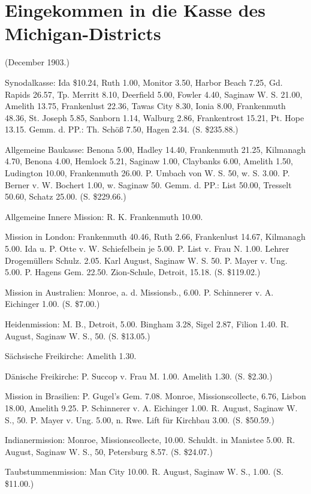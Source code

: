 \chapter[Kasse des Michigan-Districts]{Eingekommen in die Kasse des Michigan-Districts}

(December 1903.)

Synodalkasse: Ida \$10.24, Ruth 1.00, Monitor 3.50, Harbor Beach 7.25, Gd. Rapids 26.57, Tp. Merritt 8.10, Deerfield 5.00, Fowler 4.40, Saginaw W. S. 21.00, Amelith 13.75, Frankenlust 22.36, Tawas City 8.30, Ionia 8.00, Frankenmuth 48.36, St. Joseph 5.85, Sanborn 1.14, Walburg 2.86, Frankentrost 15.21, Pt. Hope 13.15. Gemm. d. PP.: Th. Schöß 7.50, Hagen 2.34. (S. \$235.88.)

Allgemeine Baukasse: Benona 5.00, Hadley 14.40, Frankenmuth 21.25, Kilmanagh 4.70, Benona 4.00, Hemlock 5.21, Saginaw 1.00, Claybanks 6.00, Amelith 1.50, Ludington 10.00, Frankenmuth 26.00. P. Umbach von W. S. 50, w. S. 3.00. P. Berner v. W. Bochert 1.00, w. Saginaw 50. Gemm. d. PP.: List 50.00, Tresselt 50.60, Schatz 25.00. (S. \$229.66.)

Allgemeine Innere Mission: R. K. Frankenmuth 10.00.

Mission in London: Frankenmuth 40.46, Ruth 2.66, Frankenlust 14.67, Kilmanagh 5.00. Ida u. P. Otte v. W. Schiefelbein je 5.00. P. List v. Frau N. 1.00. Lehrer Drogemüllers Schulz. 2.05. Karl August, Saginaw W. S. 50. P. Mayer v. Ung. 5.00. P. Hagens Gem. 22.50. Zion-Schule, Detroit, 15.18. (S. \$119.02.)

Mission in Australien: Monroe, a. d. Missionsb., 6.00. P. Schinnerer v. A. Eichinger 1.00. (S. \$7.00.)

Heidenmission: M. B., Detroit, 5.00. Bingham 3.28, Sigel 2.87, Filion 1.40. R. August, Saginaw W. S., 50. (S. \$13.05.)

Sächsische Freikirche: Amelith 1.30.

Dänische Freikirche: P. Succop v. Frau M. 1.00. Amelith 1.30. (S. \$2.30.)

Mission in Brasilien: P. Gugel’s Gem. 7.08. Monroe, Missionscollecte, 6.76, Lisbon 18.00, Amelith 9.25. P. Schinnerer v. A. Eichinger 1.00. R. August, Saginaw W. S., 50. P. Mayer v. Ung. 5.00, n. Rwe. Lift für Kirchbau 3.00. (S. \$50.59.)

Indianermission: Monroe, Missionscollecte, 10.00. Schuldt. in Manistee 5.00. R. August, Saginaw W. S., 50, Petersburg 8.57. (S. \$24.07.)

Taubstummenmission: Man City 10.00. R. August, Saginaw W. S., 1.00. (S. \$11.00.)

